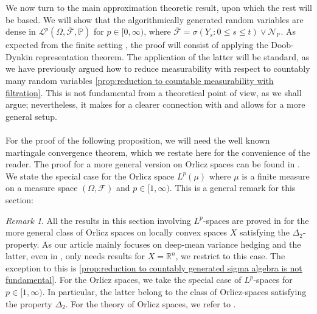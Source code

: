 \documentclass[11pt]{report}
\theoremstyle{plain} %
\theoremstyle{definition} %
\theoremstyle{remark} %
\newtheorem{remark}[remark]{Remark}
\begin{document}
We now turn to the main approximation theoretic result, upon which the rest will be based. We will show that the algorithmically generated random variables are dense in \(\mathcal{L}^p(\Omega,\overline{\mathcal{F}},\mathbb{P})\) for \(p\in[0,\infty)\), where \(\overline{\mathcal{F}}=\sigma(Y_s:0\leq s\leq t)\vee\mathcal{N}_{\mathbb{P}}\). As expected from the finite setting \parencite{Buehler2018DeepHedging}, the proof will consist of applying the Doob-Dynkin representation theorem. The application of the latter will be standard, as we have previously argued how to reduce measurability with respect to countably many random variables \cref{prop:reduction to countable measurability with filtration}. This is not fundamental from a theoretical point of view, as we shall argue; nevertheless, it makes for a clearer connection with \parencite{Buehler2018DeepHedging} and allows for a more general setup.
\\\\
For the proof of the following proposition, we will need the well known martingale convergence theorem, which we restate here for the convenience of the reader. The proof for a more general version on Orlicz spaces can be found in \parencite[Thm.~5.12]{Arandjelovic2025}. We state the special case for the Orlicz space \(L^p(\mu)\) where \(\mu\) is a finite measure on a measure space \((\Omega,\mathcal{F})\) and \(p\in[1,\infty)\). This is a general remark for this section: 
\begin{remark}
All the results in this section involving \(L^p\)-spaces are proved in 
    \parencite{Arandjelovic2025} for the more general class of Orlicz spaces on locally convex spaces \(X\) satisfying the \(\Delta_2\)-property. As our article mainly focuses on deep-mean variance hedging and the latter, even in \parencite{Arandjelovic2025}, only needs results for \(X=\mathbb{R}^n\), we restrict to this case. The exception to this is \cref{prop:reduction to countably generated sigma algebra is not fundamental}. For the Orlicz spaces, we take the special case of \(L^p\)-spaces for \(p\in[1,\infty)\). In particular, the latter belong to the class of Orlicz-spaces satisfying the property \(\Delta_2\). For the theory of Orlicz spaces, we refer to \parencite{Rao1991OrliczSpaces}.
\end{remark}
\end{document}
